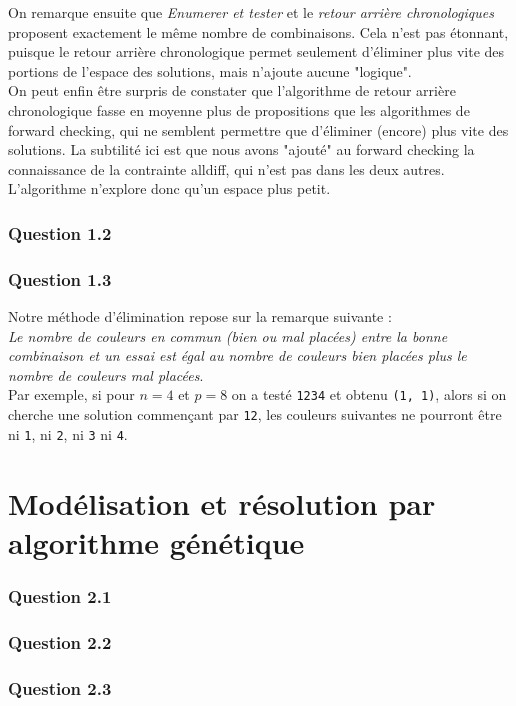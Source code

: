\documentclass[a4paper, 12pt]{report}
\newcommand{\py}[1]{\texttt{#1}}
\begin{document}
On remarque ensuite que \textit{Enumerer et tester} et le \textit{retour arrière chronologiques} proposent exactement le même nombre de combinaisons. Cela n'est pas étonnant, puisque le retour arrière chronologique permet seulement d'éliminer plus vite des portions de l'espace des solutions, mais n'ajoute aucune "logique". \\

On peut enfin être surpris de constater que l'algorithme de retour arrière chronologique fasse en moyenne plus de propositions que les algorithmes de forward checking, qui ne semblent permettre que d'éliminer (encore) plus vite des solutions. La subtilité ici est que nous avons "ajouté" au forward checking la connaissance de la contrainte alldiff, qui n'est pas dans les deux autres. L'algorithme n'explore donc qu'un espace plus petit.

\section*{Question 1.2}
\section*{Question 1.3}

Notre méthode d'élimination repose sur la remarque suivante : \\

\textit{Le nombre de couleurs en commun (bien ou mal placées) entre la bonne combinaison et un essai est égal au nombre de couleurs bien placées plus le nombre de couleurs mal placées}. \\

Par exemple, si pour $n = 4$ et $p = 8$ on a testé \py{1234} et obtenu \py{(1, 1)}, alors si on cherche une solution commençant par \py{12}, les couleurs suivantes ne pourront être ni \py{1}, ni \py{2}, ni \py{3} ni \py{4}.

\part*{Modélisation et résolution par algorithme génétique}

\section*{Question 2.1}
\section*{Question 2.2}
\section*{Question 2.3}
\end{document}
